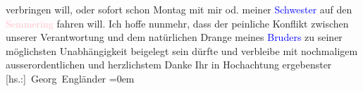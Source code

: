                     verbringen will, oder sofort schon Montag mit mir od. meiner \textcolor{blue}{Schwester}{} auf den \textcolor{pink}{Semmering}{}\ledrightnote{\textcolor{pink}{Semmering}} fahren will.\pend
           \pstart
           Ich hoffe nunmehr, dass der peinliche Konflikt zwischen unserer Verantwortung und
                    dem natürlichen Drange meines \textcolor{blue}{Bruders}{} zu seiner möglichsten Unabhängigkeit beigelegt sein dürfte und
                    verbleibe mit nochmaligem ausserordentlichen und herzlichstem Danke Ihr in\pend
           \pstart
           Hochachtung ergebenster{\\[\baselineskip]}\spacefill\mbox{{[}hs.:{]} Georg
                    Engländer}\pend
           \leftskip=0em{}\endnumbering{}  
      